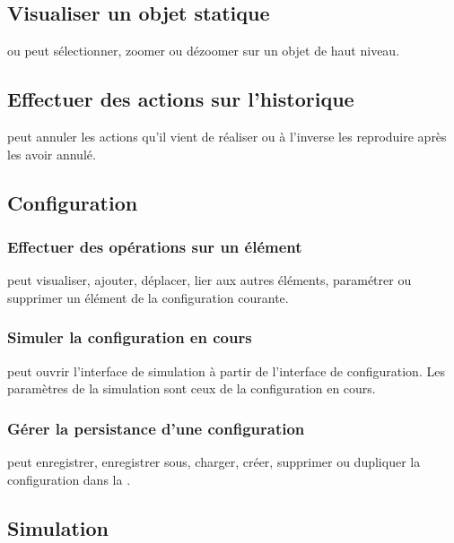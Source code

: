 \subsection{Visualiser un objet statique}
 ou  peut sélectionner, zoomer ou dézoomer sur un objet de haut niveau.

\subsection{Effectuer des actions sur l'historique}
 peut annuler les actions qu'il vient de réaliser ou à l'inverse les reproduire après les avoir annulé.

\subsection{Configuration}

\subsubsection{Effectuer des opérations sur un élément}
 peut visualiser, ajouter, déplacer, lier aux autres éléments, paramétrer ou supprimer un élément de la configuration courante.

\subsubsection{Simuler la configuration en cours}
 peut ouvrir l'interface de simulation à partir de l'interface de configuration. Les paramètres de la simulation sont ceux de la configuration en cours.

\subsubsection{Gérer la persistance d'une configuration}
 peut enregistrer, enregistrer sous, charger, créer, supprimer ou dupliquer la configuration dans la .

\subsection{Simulation}

